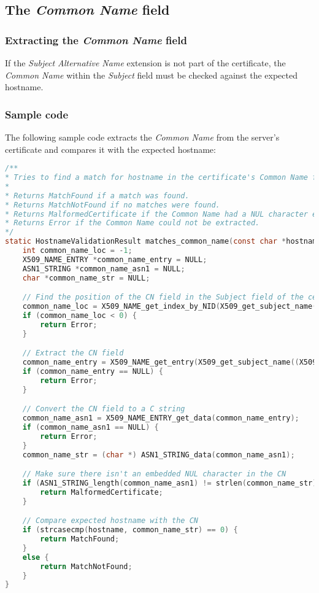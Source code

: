 \documentclass{article}
\begin{document}
\subsection{The {\em Common Name} field}

\subsubsection{Extracting the {\em Common Name} field}

If the {\em Subject Alternative Name} extension is not part of the
certificate, the {\em Common Name} within the {\em Subject} field must be
checked against the expected hostname.

\subsubsection{Sample code}

The following sample code extracts the {\em Common Name} from the server's
certificate and compares it with the expected hostname:

\begin{lstlisting}[style=code,language=C,numbers=none,caption={}]
/**
* Tries to find a match for hostname in the certificate's Common Name field.
*
* Returns MatchFound if a match was found.
* Returns MatchNotFound if no matches were found.
* Returns MalformedCertificate if the Common Name had a NUL character embedded in it.
* Returns Error if the Common Name could not be extracted.
*/
static HostnameValidationResult matches_common_name(const char *hostname, const X509 *server_cert) {
	int common_name_loc = -1;
	X509_NAME_ENTRY *common_name_entry = NULL;
	ASN1_STRING *common_name_asn1 = NULL;
	char *common_name_str = NULL;

	// Find the position of the CN field in the Subject field of the certificate
	common_name_loc = X509_NAME_get_index_by_NID(X509_get_subject_name((X509 *) server_cert), NID_commonName, -1);
	if (common_name_loc < 0) {
		return Error;
	}

	// Extract the CN field
	common_name_entry = X509_NAME_get_entry(X509_get_subject_name((X509 *) server_cert), common_name_loc);
	if (common_name_entry == NULL) {
		return Error;
	}

	// Convert the CN field to a C string
	common_name_asn1 = X509_NAME_ENTRY_get_data(common_name_entry);
	if (common_name_asn1 == NULL) {
		return Error;
	}			
	common_name_str = (char *) ASN1_STRING_data(common_name_asn1);

	// Make sure there isn't an embedded NUL character in the CN
	if (ASN1_STRING_length(common_name_asn1) != strlen(common_name_str)) {
		return MalformedCertificate;
	}

	// Compare expected hostname with the CN
	if (strcasecmp(hostname, common_name_str) == 0) {
		return MatchFound;
	}
	else {
		return MatchNotFound;
	}
}
\end{lstlisting}
\end{document}

